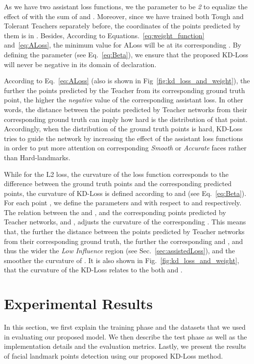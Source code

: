 \documentclass[times,twocolumn,final,authoryear]{elsarticle}
\begin{document}
As we have two assistant loss functions, we the parameter  to be \textit{2} to equalize the effect of  with the sum of  and . Moreover, since we have trained both Tough and Tolerant Teachers separately before, the coordinates of the points predicted by them is in . Besides, According to Equations.~\ref{eq:weight_function} and~\ref{eq:ALoss}, the minimum value for ALoss will be at its corresponding . By defining the parameter  (see Eq.~\ref{eq:Beta}), we ensure that the proposed KD-Loss will never be negative in its domain of declaration.

According to Eq.~\ref{eq:ALoss} (also is shown in Fig~\ref{fig:kd_loss_and_weight}), the further the points predicted by the Teacher from its corresponding ground truth point, the higher the \textit{negative} value of the corresponding assistant loss. In other words, the distance between the points predicted by Teacher networks from their corresponding ground truth can imply how hard is the distribution of that point. Accordingly, when the distribution of the ground truth points is hard, KD-Loss tries to guide the network by increasing the effect of the assistant loss functions in order to put more attention on corresponding \textit{Smooth} or \textit{Accurate} faces rather than Hard-landmarks.

While for the L2 loss, the curvature of the loss function corresponds to the difference between the ground truth points and the corresponding predicted points, the curvature of KD-Loss is defined according to  and  (see Eq.~\ref{eq:Beta}). For each point , we define the parameters  and  with respect to  and  respectively. The relation between the  and , and the corresponding points predicted by Teacher networks,  and , adjusts the curvature of the corresponding . This means that, the further the distance between the points predicted by Teacher networks from their corresponding ground truth, the further the corresponding  and , and thus the wider the \textit{Low Influence} region (see Sec.~\ref{sec:assistedLoss}), and the smoother the curvature of . It is also shown in Fig.~\ref{fig:kd_loss_and_weight}, that the curvature of the KD-Loss relates to the both  and .

\section{Experimental Results}
\label{sec:experiment}
In this section, we first explain the training phase and the datasets that we used in evaluating our proposed model. We then describe the test phase as well as the implementation details and the evaluation metrics. Lastly, we present the results of facial landmark points detection using our proposed KD-Loss method.
\end{document}
